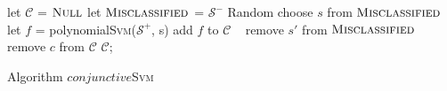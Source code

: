 \begin{algorithm}[!h]
\SetAlgoVlined
\Indm
{}
\Indp
    let $\mathcal{C}$ = $\textsc{Null}$\;
    let $\textsc{Misclassified}$ = $\mathcal{S}^-$\;
     {
        Random choose $s$ from $\textsc{Misclassified}$\;
        let $f$ = polynomial\textsc{Svm}($\mathcal{S}^+$, s)\;
        add $f$ to $\mathcal{C}$\;
         {\
             {
                remove $s'$ from $\textsc{Misclassified}$\;
            }
        }
     {
         {
            remove $c$ from $\mathcal{C}$\;
        }
    }
    }
    \Return $\mathcal{C}$;
\caption{Algorithm $conjunctive$\textsc{Svm}}
\label{alg:conjunctiveSVM}
\end{algorithm}






